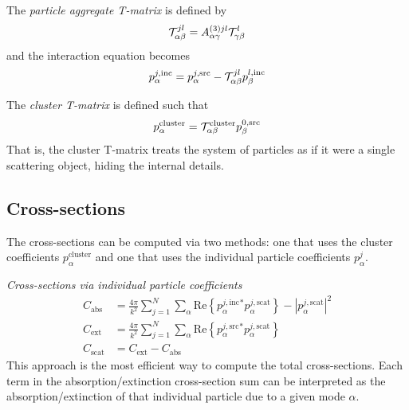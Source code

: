 \documentclass[11pt]{article}
\begin{document}
The \emph{particle aggregate T-matrix} is defined by 
\begin{equation}
    \mathcal{T}_{\alpha\beta}^{jl} =
    A_{\alpha \gamma}^{(3)jl}
    \mathcal{T}_{\gamma \beta}^l
\label{eqn:particle_aggregate_tmatrix}
\end{equation}
and the interaction equation becomes
\begin{equation}
    p_{\alpha}^{j,\text{inc}} = 
    p_{\alpha}^{j,\text{src}} -
    \mathcal{T}_{\alpha \beta}^{jl}
    p_{\beta}^{l,\text{inc}}
\end{equation}

The \emph{cluster T-matrix} is defined such that
\begin{equation}
    p_\alpha^{\text{cluster}} = \mathcal{T}_{\alpha\beta}^{\text{cluster}} p_\beta^{0,\text{src}}
\label{eqn:cluster_tmatrix}
\end{equation}
That is, the cluster T-matrix treats the system of particles as if it were a single scattering object, hiding the internal details.

\subsection{Cross-sections}

The cross-sections can be computed via two methods: one that uses the cluster coefficients $p_\alpha^\text{cluster}$ and one that uses the individual particle coefficients $p_\alpha^j$.

\hfill

\textit{Cross-sections via individual particle coefficients}
\begin{subequations}
\begin{align}
    C_\text{abs} &= \frac{4\pi}{k^2} \sum_{j=1}^N \sum_{\alpha}
        \text{Re} \left\{p_\alpha^{j,\text{inc}}^* p_\alpha^{j,\text{scat}} \right\} 
        - |p_\alpha^{j,\text{scat}}|^2\\
    C_\text{ext} &= \frac{4\pi}{k^2} \sum_{j=1}^N \sum_{\alpha}
        \text{Re} \left\{p_\alpha^{j,\text{src}}^* p_\alpha^{j,\text{scat}} \right\} \\
    C_\text{scat} &= C_\text{ext} - C_\text{abs}
\end{align}
\label{eqn:cross_sections}
\end{subequations}
This approach is the most efficient way to compute the total cross-sections.
Each term in the absorption/extinction cross-section sum can be interpreted as the absorption/extinction of that individual particle due to a given mode $\alpha$.
\end{document}
